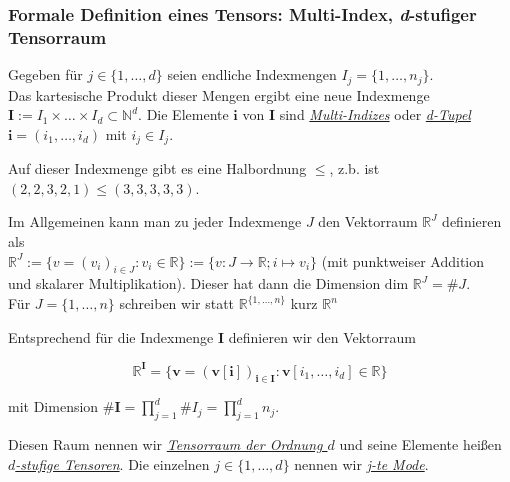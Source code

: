 \documentclass[11pt]{article} %
\begin{document}
\subsubsection{Formale Definition eines Tensors: Multi-Index, \textit{d}-stufiger Tensorraum}
\begin{changemargin}{0pt}{0pt}
\begin{definition}
Gegeben für $j \in \{1,\dots , d \}$ seien endliche Indexmengen
$I_{j} = \{1,\dots , n_{j} \}$.\\
Das kartesische Produkt dieser Mengen ergibt eine neue Indexmenge $\mathbf{I} := I_{1} \times \dots \times I_{d} \subset \mathbb{N}^{d}.$
Die Elemente $\mathbf{i}$ von $\mathbf{I}$ sind \underline{\textit{Multi-Indizes}} oder \underline{\textit{d-Tupel}}
$\mathbf{i} = (i_{1},\dots , i_{d})$ mit $i_{j} \in I_{j}$.

Auf dieser Indexmenge gibt es eine Halbordnung $\leq$, z.b. ist $(2,2,3,2,1) \leq (3,3,3,3,3)$.

Im Allgemeinen kann man zu jeder Indexmenge $J$ den Vektorraum $\mathbb{R}^{J}$ definieren als\\
$\mathbb{R}^{J} := \{ v = (v_{i})_{i \in J} : v_{i} \in \mathbb{R} \} := \{v : J \rightarrow \mathbb{R}; i \mapsto v_{i} \}$
(mit punktweiser Addition und skalarer Multiplikation). Dieser hat dann die Dimension
$\text{dim } \mathbb{R}^{J} = \#J$.\\
Für $J=\{1,\dots,n\}$ schreiben wir statt $\mathbb{R}^{\{1,\dots,n\}}$ kurz $\mathbb{R}^{n}$

Entsprechend für die Indexmenge $\mathbf{I}$ definieren wir den Vektorraum

\begin{equation} \label{eq:1.1}
\mathbb{R}^{\mathbf{I}} = \{\mathbf{v} = (\mathbf{v[i]})_{\mathbf{i} \in \mathbf{I}} : \mathbf{v}[i_{1},\dots,i_{d}] \in \mathbb{R} \}
\end{equation}

mit Dimension $\#\mathbf{I} = \prod_{j=1}^{d} \#I_{j} = \prod_{j=1}^{d} n_{j}$.

Diesen Raum nennen wir \underline{\textit{Tensorraum der Ordnung $d$}} und seine Elemente heißen\\
\underline{\textit{$d$-stufige Tensoren}}. Die einzelnen $j \in \{1,\dots,d\}$ nennen wir \underline{\textit{j-te Mode}}. \\
\end{definition}


\end{changemargin}
\end{document}
